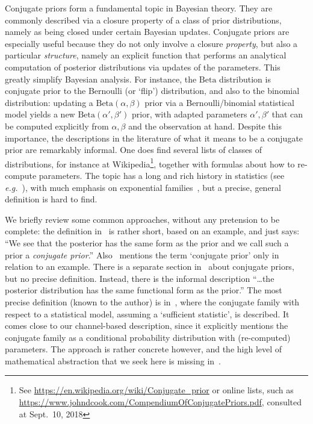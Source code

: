 \documentclass{mscs}
\newcommand{\betachan}{\ensuremath{\mathrm{Beta}}}
\begin{document}

%
%

Conjugate priors form a fundamental topic in Bayesian theory.  They
are commonly described via a closure property of a class of prior
distributions, namely as being closed under certain Bayesian updates.
Conjugate priors are especially useful because they do not only
involve a closure \emph{property}, but also a particular
\emph{structure}, namely an explicit function that performs an
analytical computation of posterior distributions via updates of the
parameters. This greatly simplify Bayesian analysis. For instance, the
$\betachan$ distribution is conjugate prior to the Bernoulli (or
`flip') distribution, and also to the binomial distribution: updating
a $\betachan(\alpha,\beta)$ prior via a Bernoulli/binomial statistical
model yields a new $\betachan(\alpha',\beta')$ prior, with adapted
parameters $\alpha',\beta'$ that can be computed explicitly from
$\alpha,\beta$ and the observation at hand. Despite this importance,
the descriptions in the literature of what it means to be a conjugate
prior are remarkably informal.  One does find several lists of classes
of distributions, for instance at Wikipedia\footnote{See
  \url{https://en.wikipedia.org/wiki/Conjugate_prior} or online lists,
  such as
  \url{https://www.johndcook.com/CompendiumOfConjugatePriors.pdf},
  consulted at Sept.\ 10, 2018}, together with formulas about how to
re-compute parameters.  The topic has a long and rich history in
statistics (see \textit{e.g.}~\cite{Bishop06}), with much emphasis on
exponential families~\cite{DiaconisY79}, but a precise, general
definition is hard to find.

We briefly review some common approaches, without any pretension to be
complete: the definition in~\cite{Alpaydin10} is rather short, based
on an example, and just says: ``We see that the posterior has the same
form as the prior and we call such a prior a \emph{conjugate prior}.''
Also~\cite{RussellN03} mentions the term `conjugate prior' only in
relation to an example. There is a separate section in~\cite{Bishop06}
about conjugate priors, but no precise definition. Instead, there is
the informal description ``\ldots the posterior distribution has the
same functional form as the prior.'' The most precise definition
(known to the author) is in~\cite[\S5.2]{BernardoS00}, where the
conjugate family with respect to a statistical model, assuming a
`sufficient statistic', is described. It comes close to our
channel-based description, since it explicitly mentions the conjugate
family as a conditional probability distribution with (re-computed)
parameters.  The approach is rather concrete however, and the high
level of mathematical abstraction that we seek here is missing
in~\cite{BernardoS00}.
\end{document}
